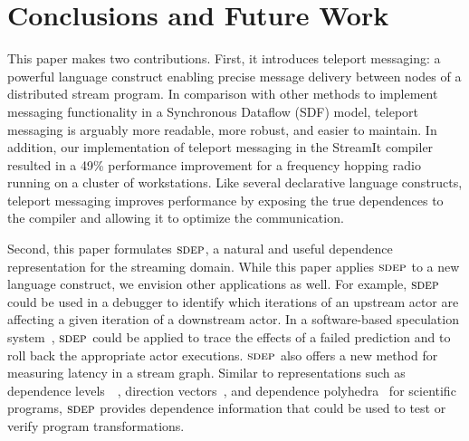 \section{Conclusions and Future Work}
\label{sec:conclusion}

This paper makes two contributions.  First, it introduces teleport
messaging: a powerful language construct enabling precise message
delivery between nodes of a distributed stream program.  In comparison
with other methods to implement messaging functionality in a
Synchronous Dataflow (SDF) model, teleport messaging is arguably more
readable, more robust, and easier to maintain.  In addition, our
implementation of teleport messaging in the StreamIt compiler resulted
in a 49\% performance improvement for a frequency hopping radio
running on a cluster of workstations.  Like several declarative
language constructs, teleport messaging improves performance by
exposing the true dependences to the compiler and allowing it to
optimize the communication.


Second, this paper formulates $\textsc{sdep}$, a natural and useful dependence
representation for the streaming domain.  While this paper applies
$\textsc{sdep}$ to a new language construct, we envision other applications as
well.  For example, $\textsc{sdep}$ could be used in a debugger to identify
which iterations of an upstream actor are affecting a given iteration
of a downstream actor.  In a software-based speculation
system~\cite{frank-thesis}, $\textsc{sdep}$ could be applied to trace the
effects of a failed prediction and to roll back the appropriate actor
executions.  $\textsc{sdep}$ also offers a new method for measuring latency in
a stream graph.  Similar to representations such as dependence
levels~~\cite{AK82}, direction vectors~\cite{wolfe82}, and dependence
polyhedra~\cite{Irig88} for scientific programs, $\textsc{sdep}$ provides
dependence information that could be used to test or verify program
transformations.

